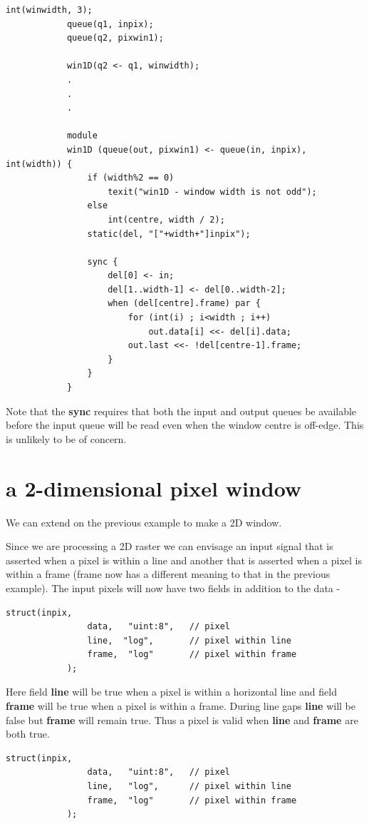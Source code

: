         \begin{lstlisting}[gobble=8, language=threepl]
            int(winwidth, 3);
            queue(q1, inpix);
            queue(q2, pixwin1);

            win1D(q2 <- q1, winwidth);
            .
            .
            .

            module
            win1D (queue(out, pixwin1) <- queue(in, inpix), int(width)) {
                if (width%2 == 0)
                    texit("win1D - window width is not odd");
                else
                    int(centre, width / 2);
                static(del, "["+width+"]inpix");

                sync {
                    del[0] <- in;
                    del[1..width-1] <- del[0..width-2];
                    when (del[centre].frame) par {
                        for (int(i) ; i<width ; i++)
                            out.data[i] <<- del[i].data;
                        out.last <<- !del[centre-1].frame;
                    }
                }
            }        
        \end{lstlisting}
        Note that the {\bf sync} requires that both the input and output
        queues be available before the input queue will be read even when
        the window centre is off-edge. This is unlikely to be of concern.


    \section{a 2-dimensional pixel window}\label{sec:ex2Dw}

        We can extend on the previous example to make a 2D window.

        Since we are processing a 2D
        raster we can envisage an input signal that is asserted when a pixel is
        within a line and another that is asserted when a pixel is within a
        frame (frame now has a different meaning to that in the previous
        example). The input pixels will now have two fields in addition to the
        data -
        \begin{lstlisting}[gobble=8, language=threepl]
            struct(inpix,
                data,   "uint:8",   // pixel
                line,  "log",       // pixel within line
                frame,  "log"       // pixel within frame
            );
        \end{lstlisting}
        Here field {\bf line} will be true when a pixel is within a horizontal
        line and field {\bf frame} will be true when a pixel is within a frame.
        During line gaps {\bf line} will be false but {\bf frame} will remain
        true. Thus a pixel is valid when {\bf line} and {\bf frame} are both
        true.
        \begin{lstlisting}[gobble=8, language=threepl]
            struct(inpix,
                data,   "uint:8",   // pixel
                line,   "log",      // pixel within line
                frame,  "log"       // pixel within frame
            );
        \end{lstlisting}
        
